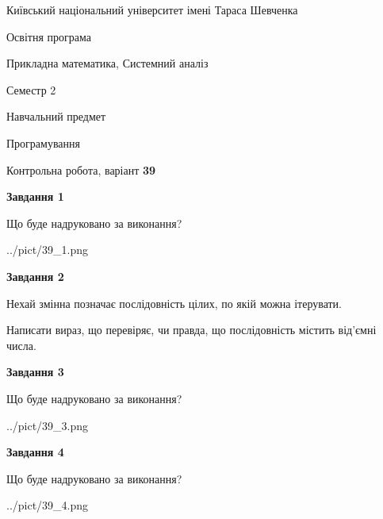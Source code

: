 \documentclass[12pt, ukrainian]{article}
\begin{document}
{{\begin {small}\par
{ \center  Київський національний університет імені Тараса Шевченка \par}
{\parbox {5 cm}{Освітня програма \hfill}{\parbox {8 cm}{Прикладна математика, Системний аналіз \hfill}}\parbox {5 cm}{\hfill Семестр 2}}\par
{\parbox {5 cm} {Навчальний предмет \hfill}\parbox {7 cm}{Програмування \hfill}\parbox {6cm}{\hfill}\par}\vspace{-7pt} \end{small}}{\center Контрольна робота, варіант  \No \textbf
{ 39 }\par}}
{
\begin {large}
{\begin {center}\textbf{Завдання 1}\end {center}}\par
Що буде надруковано за виконання?\par\par
\begin{center}
	{../pict/39_1.png}
\end{center}
\newpage

{\begin {center}\textbf{Завдання 2}\end {center}}\par
Нехай змінна  позначає послідовність цілих, по якій можна ітерувати.

Написати вираз, що перевіряє, чи правда, що послідовність  містить від’ємні числа.\par
\newpage

{\begin {center}\textbf{Завдання 3}\end {center}}\par
Що буде надруковано за виконання?
\begin{center}
	{../pict/39_3.png}
\end{center}
\newpage

{\begin {center}\textbf{Завдання 4}\end {center}}\par
Що буде надруковано за виконання?\par
\begin{center}
	{../pict/39_4.png}
\end{center}
\newpage


\end{large}}
\end{document}
